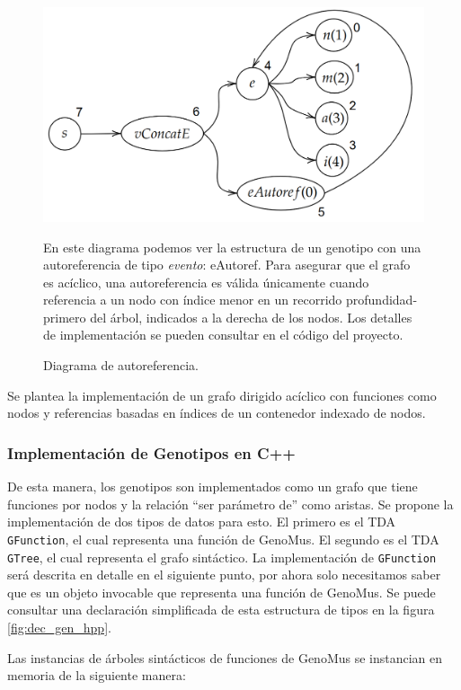 \begin{figure}
    \centering
    \includegraphics[width=\textwidth]{imagenes/autoreference.png}
    \caption{Diagrama de autoreferencia.} En este diagrama podemos ver la estructura de un genotipo con una autoreferencia de tipo \textit{evento}: eAutoref. Para asegurar que el grafo es acíclico, una autoreferencia es válida únicamente cuando referencia a un nodo con índice menor en un recorrido profundidad-primero del árbol, indicados a la derecha de los nodos. Los detalles de implementación se pueden consultar en el código del proyecto.
    \label{fig:autoreferencia}
\end{figure}

Se plantea la implementación de un grafo dirigido acíclico con funciones como nodos y referencias basadas en índices de un contenedor indexado de nodos. 

 
\subsubsection{Implementación de Genotipos en C++}

De esta manera, los genotipos son implementados como un grafo que tiene funciones por nodos y la relación ``ser parámetro de'' como aristas. Se propone la implementación de dos tipos de datos para esto. El primero es el TDA \verb|GFunction|, el cual representa una función de GenoMus. El segundo es el TDA \verb|GTree|, el cual representa el grafo sintáctico. La implementación de \verb|GFunction| será descrita en detalle en el siguiente punto, por ahora solo necesitamos saber que es un objeto invocable que representa una función de GenoMus. Se puede consultar una declaración simplificada de esta estructura de tipos en la figura \ref{fig:dec_gen_hpp}. 

Las instancias de árboles sintácticos de funciones de GenoMus se instancian en memoria de la siguiente manera:

